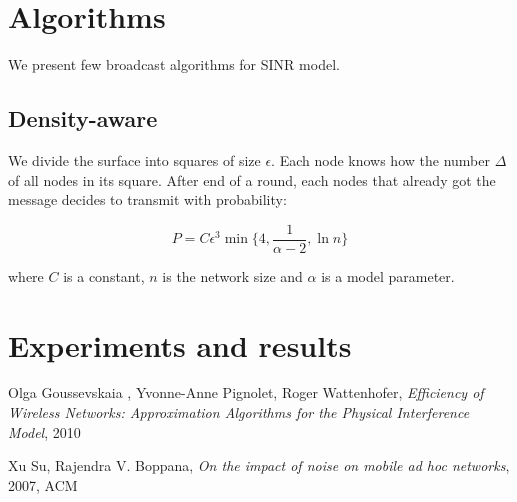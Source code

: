 \documentclass[a4paper,draft,12pt]{report}
\begin{document}
\chapter{Algorithms}

We present few broadcast algorithms for SINR model.

\section{Density-aware}

We divide the surface into squares of size $\epsilon$. Each node knows how the number $\Delta$ of all nodes in its square. After end of a round, each nodes that already got the message decides to transmit with probability:

\begin{equation}
\label{eq:dens_alg_prob}
P = C  \epsilon^3  \min\{4, \frac{1}{\alpha - 2}, \ln n\}
\end{equation}

where $C$ is a constant, $n$ is the network size and $\alpha$ is a model  parameter.

\chapter{Experiments and results}

\begin{thebibliography}{9}

Olga Goussevskaia , Yvonne-Anne
Pignolet, Roger Wattenhofer,
\emph{Efficiency of Wireless Networks:
Approximation Algorithms
for the Physical Interference Model},
2010

Xu Su, Rajendra V. Boppana,
\emph{On the impact of noise on mobile ad hoc networks},
2007, ACM

\end{thebibliography}
\end{document}
